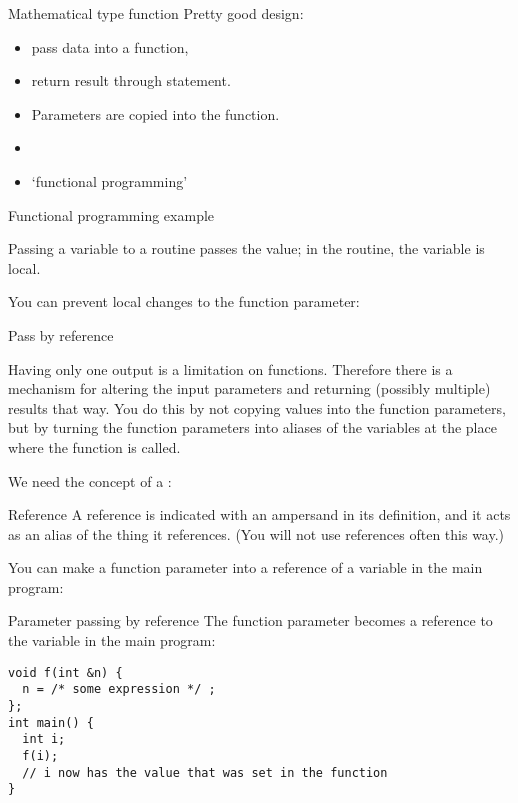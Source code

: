 \begin{slide}{Mathematical type function}
  \label{sl:func-functional}
  Pretty good design:
  \begin{itemize}
  \item pass data into a function,
  \item return result through  statement.
  \item Parameters are copied into the function.
  \item {}
  \item `functional programming'
  \end{itemize}
\end{slide}
\begin{slide}{Functional programming example}
  \label{sl:func-functional-ex}
\end{slide}

Passing a variable to a routine passes the value; in the routine, the
variable is local.


You can prevent local changes to the function parameter:


 {Pass by reference}
\label{sec:pass-by-ref}
  
Having only one output is a limitation on functions. Therefore there
is a mechanism for altering the input parameters and returning
(possibly multiple) results that way. You do this by not copying
values into the function parameters, but by turning the function
parameters into aliases of the variables at the place where the
function is called.

We need the concept of a :
\begin{block}{Reference}
  \label{sl:cpp-reference}
  A reference is indicated with an ampersand in its definition, and it
  acts as an alias of the thing it references.
  (You will not use references often this way.)
\end{block}

You can make a function parameter into a reference of a variable in
the main program:

\begin{block}{Parameter passing by reference}
  \label{sl:pass-by-ref}
The function parameter  becomes a reference to the variable 
in the main program:
\begin{verbatim}
void f(int &n) {
  n = /* some expression */ ;
};
int main() {
  int i;
  f(i);
  // i now has the value that was set in the function
}
\end{verbatim}
\end{block}

